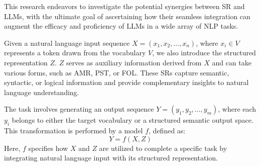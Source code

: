 

This research endeavors to investigate the potential synergies between SR and LLMs, with the ultimate goal of ascertaining how their seamless integration can augment the efficacy and proficiency of LLMs in a wide array of NLP tasks. 

Given a natural language input sequence \( X = (x_1, x_2, \ldots, x_n) \), where \( x_i \in V \) represents a token drawn from the vocabulary \( V \), we also introduce the structured representation \( Z \). \( Z \) serves as auxiliary information derived from \( X \) and can take various forms, such as AMR, PST, or FOL. These SRs capture semantic, syntactic, or logical information and provide complementary insights to natural language understanding.

The task involves generating an output sequence \( Y = (y_1, y_2, \ldots, y_m) \), where each \( y_i \) belongs to either the target vocabulary or a structured semantic output space. This transformation is performed by a model \( f \), defined as:
    \begin{equation}
        Y = f(X, Z)
    \end{equation}
Here, \( f \) specifies how \( X \) and \( Z \) are utilized to complete a specific task by integrating natural language input with its structured representation.

